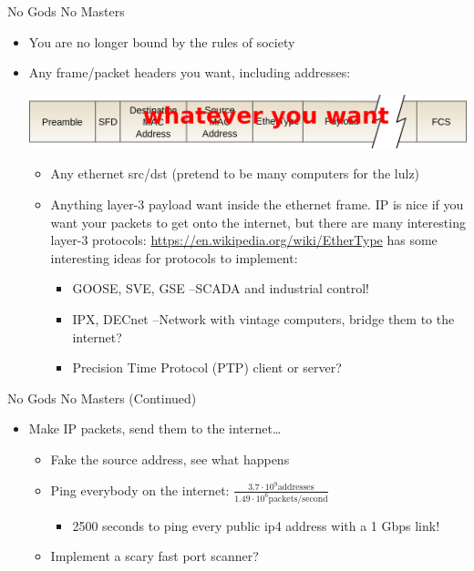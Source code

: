 \documentclass[presentation]{beamer}
\begin{document}
\begin{frame}[label={sec:org5621daa}]{No Gods No Masters}
\begin{itemize}
\item You are no longer bound by the rules of society
\item Any frame/packet headers you want, including addresses:
\begin{center}
\includegraphics[width=1.0\linewidth]{./ethernet.png}
\end{center}
\begin{itemize}
\item Any ethernet src/dst (pretend to be many computers for the lulz)
\item Anything layer-3 payload want inside the ethernet frame. IP is
nice if you want your packets to get onto the internet, but
there are many interesting layer-3 protocols:
\url{https://en.wikipedia.org/wiki/EtherType} has some interesting
ideas for protocols to implement:
\begin{itemize}
\item GOOSE, SVE, GSE --SCADA and industrial control!
\item IPX, DECnet --Network with vintage computers, bridge them to
the internet?
\item Precision Time Protocol (PTP) client or server?
\end{itemize}
\end{itemize}
\end{itemize}
\end{frame}

\begin{frame}[label={sec:orgbaff8b2}]{No Gods No Masters (Continued)}
\begin{itemize}
\item Make IP packets, send them to the internet\ldots{}
\begin{itemize}
\item Fake the source address, see what happens
\item Ping everybody on the internet: \(\frac{3.7 \cdot 10^9 \text{addresses}}{1.49 \cdot 10^6 \text{packets/second}}\)
\begin{itemize}
\item 2500 seconds to ping every public ip4 address with a 1 Gbps link!
\end{itemize}
\item Implement a scary fast port scanner?
\end{itemize}
\end{itemize}
\end{frame}
\end{document}
